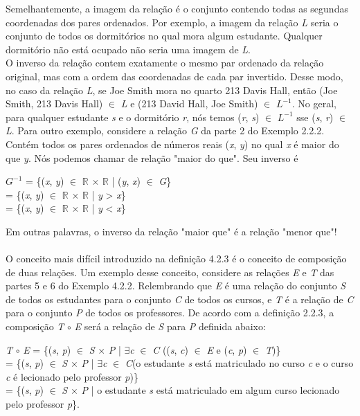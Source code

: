 Semelhantemente, a imagem da relação é o conjunto contendo todas as segundas coordenadas dos pares ordenados. Por exemplo, a imagem da relação \textit{L} seria o conjunto de todos os dormitórios no qual mora algum estudante. Qualquer dormitório não está ocupado não seria uma imagem de \textit{L}.
\\
O inverso da relação contem exatamente o mesmo par ordenado da relação original, mas com a ordem das coordenadas de cada par invertido. Desse modo, no caso da relação \textit{L}, se Joe Smith mora no quarto 213 Davis Hall, então (Joe Smith, 213 Davis Hall) $\in$ \textit{L} e (213 David Hall, Joe Smith) $\in$ $\textit{L}^{-1}$. No geral, para qualquer estudante \textit{s} e o dormitório \textit{r}, nós temos (\textit{r}, \textit{s}) $\in$ $\textit{L}^{-1}$ sse (\textit{s}, \textit{r}) $\in$ \textit{L}. Para outro exemplo, considere a relação \textit{G} da parte 2 do Exemplo 2.2.2. Contém todos os pares ordenados de números reais (\textit{x}, \textit{y}) no qual \textit{x} é maior do que \textit{y}. Nós podemos chamar de relação "maior do que". Seu inverso é 

\begin{center}
$\textit{G}^{-1}$ = \{(\textit{x}, \textit{y}) $\in$ $\mathbb{R}$ $\times$ $\mathbb{R}$ | (\textit{y}, \textit{x}) $\in$ \textit{G}\}
\\
= \{(\textit{x}, \textit{y}) $\in$ $\mathbb{R}$ $\times$ $\mathbb{R}$ | \textit{y} > \textit{x}\}
\\
= \{(\textit{x}, \textit{y}) $\in$ $\mathbb{R}$ $\times$ $\mathbb{R}$ | \textit{y} < \textit{x}\}
\end{center}

Em outras palavras, o inverso da relação "maior que" é a relação "menor que"!
\\
\\

O conceito mais difícil introduzido na definição 4.2.3 é o conceito de composição de duas relações. Um exemplo desse conceito, considere as relações \textit{E} e \textit{T} das partes 5 e 6 do Exemplo 4.2.2. Relembrando que \textit{E} é uma relação do conjunto \textit{S} de todos os estudantes para o conjunto \textit{C} de todos os cursos, e \textit{T} é a relação de \textit{C} para o conjunto \textit{P} de todos os professores. De acordo com a definição 2.2.3, a composição \textit{T} $\circ$ \textit{E} será a relação de \textit{S} para \textit{P} definida abaixo:

\begin{center}
\textit{T} $\circ$ \textit{E} = \{(\textit{s}, \textit{p}) $\in$ \textit{S} $\times$ \textit{P} | $\exists$\textit{c} $\in$ \textit{C} ((\textit{s}, \textit{c}) $\in$ \textit{E} e (\textit{c}, \textit{p}) $\in$ \textit{T})\}
\\
= \{(\textit{s}, \textit{p}) $\in$ \textit{S} $\times$ \textit{P} | $\exists$\textit{c} $\in$ \textit{C}(o estudante \textit{s} está matriculado no curso \textit{c} e o curso \textit{c} é lecionado pelo professor \textit{p})\}
\\
= \{(\textit{s}, \textit{p}) $\in$ \textit{S} $\times$ \textit{P} | o estudante \textit{s} está matriculado em algum curso lecionado pelo professor \textit{p}\}.
\end{center}

